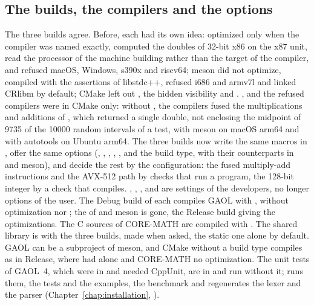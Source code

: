 \documentclass[12pt,a4paper,twoside,openright]{book}
\begin{document}
\subsection{The builds, the compilers and the options}
\label{sec:changes-builds}
%

The three builds agree.\newinvfive{} Before, each had its own idea:
 optimized only when the compiler was named 
exactly, computed the doubles of 32-bit x86 on the x87 unit, read the
processor of the machine building rather than the target of the compiler, and
refused macOS, Windows, s390x and riscv64; meson did not optimize, compiled
with the assertions of libstdc++, refused i686 and armv7l and linked CRlibm
by default; CMake left out , the hidden visibility and
. , 
and the refused compilers were in CMake only: without
, the compilers fused the multiplications and
additions of , which returned a single double, not enclosing the
midpoint of 9735 of the 10000 random intervals of a test, with meson on
macOS arm64 and with autotools on Ubuntu arm64. The three builds now write
the same macros in , offer the same options
(, , ,
, ,  and
the build type, with their counterparts in  and meson), and
decide the rest by the configuration: the fused multiply-add instructions and
the AVX-512 path by checks that run a program, the 128-bit integer by a check
that compiles. , ,
,  and
 are settings of the developers, no longer options
of the user. The Debug build of each compiles GAOL with , without
optimization nor ; the  of
 and meson is gone, the Release build giving the
optimizations. The C sources of CORE-MATH are compiled with
. The shared library is  with the
three builds, made when asked, the static one alone by default. GAOL can be a
subproject of meson, and CMake without a build type compiles as in Release,
where  had  alone and CORE-MATH no optimization.
The unit tests of GAOL~4, which were in  and needed CppUnit,
are in  and run without it;  runs them,
 the tests and the examples,  the benchmark
and  regenerates the lexer and the parser
(Chapter~\ref{chap:installation}, ).
\end{document}
